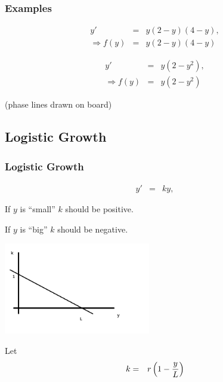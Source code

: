 \begin{frame}
  \frametitle{Examples}


  \begin{eqnarray*}
    y' & = & y(2-y)(4-y), \\
    \Rightarrow f(y) & = & y(2-y)(4-y)
  \end{eqnarray*}

  \begin{eqnarray*}
    y' & = & y(2-y^2), \\
    \Rightarrow f(y) & = & y(2-y^2)
  \end{eqnarray*}

  (phase lines drawn on board)

\end{frame}


\subsection{Logistic Growth}

\begin{frame}
  \frametitle{Logistic Growth}

  \vspace*{-4em}
  \begin{eqnarray*}
    y' & = & ky,
  \end{eqnarray*}
  
  If $y$ is ``small'' $k$ should be positive.

  If $y$ is ``big'' $k$ should be negative.

  \includegraphics[height=4cm]{week3GrowthRate}

  Let 
  \begin{eqnarray*}
    k & = & r \left( 1 - \frac{y}{L} \right)
  \end{eqnarray*}


\end{frame}



